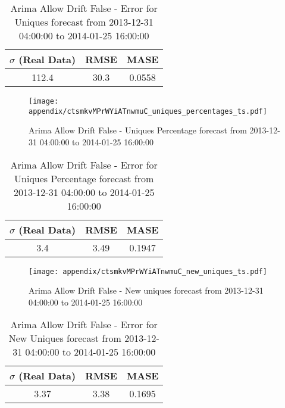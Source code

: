 \begin{table}[H]
\centering
\footnotesize
\begin{tabular}{ccc}
$\sigma$ (Real Data) & RMSE & MASE   \\ \hline
112.4 & 30.3 & 0.0558 \\
\end{tabular}

\vspace{0.5cm}

\caption{
Arima Allow Drift False - Error for Uniques forecast from 2013-12-31 04:00:00 to 2014-01-25 16:00:00}
\end{table}

\begin{figure}[H] \begin{center} \leavevmode
\texttt{[image: appendix/ctsmkvMPrWYiATnwmuC\_uniques\_percentages\_ts.pdf]} \caption{
Arima Allow Drift False - Uniques Percentage forecast from 2013-12-31 04:00:00 to 2014-01-25 16:00:00} \label{fig:appendix/ctsmkvMPrWYiATnwmuC_uniques_percentages_ts.pdf} \end{center}
\end{figure}

\begin{table}[H]
\centering
\footnotesize
\begin{tabular}{ccc}
$\sigma$ (Real Data) & RMSE & MASE   \\ \hline
3.4 & 3.49 & 0.1947 \\
\end{tabular}

\vspace{0.5cm}

\caption{
Arima Allow Drift False - Error for Uniques Percentage forecast from 2013-12-31 04:00:00 to 2014-01-25 16:00:00}
\end{table}

\begin{figure}[H] \begin{center} \leavevmode
\texttt{[image: appendix/ctsmkvMPrWYiATnwmuC\_new\_uniques\_ts.pdf]} \caption{
Arima Allow Drift False - New uniques forecast from 2013-12-31 04:00:00 to 2014-01-25 16:00:00} \label{fig:appendix/ctsmkvMPrWYiATnwmuC_new_uniques_ts.pdf} \end{center}
\end{figure}

\begin{table}[H]
\centering
\footnotesize
\begin{tabular}{ccc}
$\sigma$ (Real Data) & RMSE & MASE   \\ \hline
3.37 & 3.38 & 0.1695 \\
\end{tabular}

\vspace{0.5cm}

\caption{
Arima Allow Drift False - Error for New Uniques forecast from 2013-12-31 04:00:00 to 2014-01-25 16:00:00}
\end{table}


